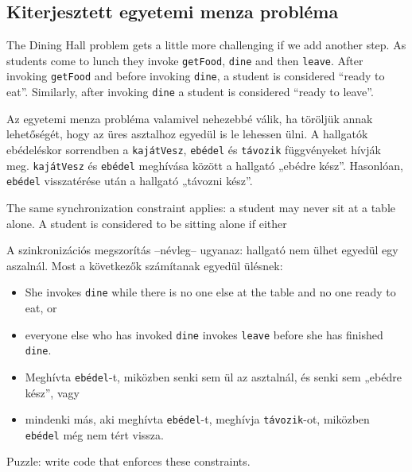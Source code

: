 \documentclass{book}
\begin{document}
\subsection{Kiterjesztett egyetemi menza probléma}

The Dining Hall problem gets a little more challenging if we
add another step.  As students come to lunch they
invoke {\tt getFood}, {\tt dine} and then {\tt leave}.
After invoking {\tt getFood} and before invoking {\tt dine},
a student is considered ``ready to eat''.  Similarly, after
invoking {\tt dine} a student is considered ``ready to leave''.

Az egyetemi menza probléma valamivel nehezebbé válik, ha töröljük
annak lehetőségét, hogy az üres asztalhoz egyedül is le lehessen
ülni. A hallgatók ebédeléskor sorrendben a {\tt kajátVesz}, {\tt ebédel}
és {\tt távozik} függvényeket hívják meg. {\tt kajátVesz} és {\tt ebédel}
meghívása között a hallgató „ebédre kész”. Hasonlóan, {\tt ebédel}
visszatérése után a hallgató „távozni kész”.

The same synchronization constraint applies: a student may never sit
at a table alone.  A student is considered to be sitting alone if
either

A szinkronizációs megszorítás --névleg-- ugyanaz: hallgató nem ülhet
egyedül egy aszalnál. Most a következők számítanak egyedül ülésnek:

\begin{itemize}

\item She invokes {\tt dine} while there is no one else at the table
and no one ready to eat, or

\item everyone else who has invoked {\tt dine} invokes {\tt leave}
before she has finished {\tt dine}.

\end{itemize}

\begin{itemize}

\item Meghívta {\tt ebédel}-t, miközben senki sem ül az asztalnál, és
senki sem  „ebédre kész”, vagy

\item mindenki más, aki meghívta {\tt ebédel}-t, meghívja {\tt távozik}-ot,
miközben {\tt ebédel} még nem tért vissza.

\end{itemize}

Puzzle: write code that enforces these constraints.
\end{document}
